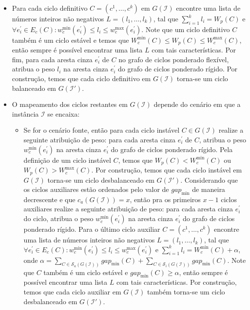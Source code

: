 \begin{itemize}
  \item Para cada ciclo definitivo $C=(c^1,\dots,c^k)$ em $G(\mathcal{I})$ encontre uma lista de números inteiros não negativos $L=(l_1,\dots,l_k)$, tal que $\sum_{i=1}^{k}l_i = W_p(C)$ e $\forall e^{\prime}_i \in E_c(C): w^{\min}_c(e^{\prime}_i) \le l_i \le w^{\max}_c(e^{\prime}_i)$. Note que um ciclo definitivo $C$ também é um ciclo estável e temos que $W^{\min}_c(C) \le W_p(C) \le W^{\max}_c(C)$, então sempre é possível encontrar uma lista $L$ com tais características. Por fim, para cada aresta cinza $e^{\prime}_i$ de $C$ no grafo de ciclos ponderado flexível, atribua o peso $l_i$ na aresta cinza $e^{\prime}_i$ do grafo de ciclos ponderado rígido. Por construção, temos que cada ciclo definitivo em $G(\mathcal{I})$ torna-se um ciclo balanceado em $G(\mathcal{I}')$.
  \item O mapeamento dos ciclos restantes em $G(\mathcal{I})$ depende do cenário em que a instância $\mathcal{I}$ se encaixa: 

  \begin{itemize}
    \item Se for o cenário fonte, então para cada ciclo instável $C \in G(\mathcal{I})$ realize a seguinte atribuição de peso: para cada aresta cinza $e^{\prime}_i$ de $C$, atribua o peso $w^{\min}_c(e^{\prime}_i)$ na aresta cinza $e^{\prime}_i$ do grafo de ciclos ponderado rígido. Pela definição de um ciclo instável $C$, temos que $W_p(C)  < W^{\min}_c(C)$ ou $W_p(C) > W^{\max}_c(C)$. Por construção, temos que cada ciclo instável em $G(\mathcal{I})$ torna-se um ciclo desbalanceado em $G(\mathcal{I}')$. Considerando que os ciclos auxiliares estão ordenados pelo valor de $gap_{\min}$ de maneira decrescente e que $c_a(G(\mathcal{I})) = x$, então pra os primeiros $x-1$ ciclos auxiliares realize a seguinte atribuição de peso: para cada aresta cinza $e^{\prime}_i$ do ciclo, atribua o peso $w^{\min}_c(e^{\prime}_i)$ na aresta cinza $e^{\prime}_i$ do grafo de ciclos ponderado rígido. Para o último ciclo auxiliar $C=(c^1,\dots,c^k)$ encontre uma lista de números inteiros não negativos $L=(l_1,\dots,l_k)$, tal que $\forall e^{\prime}_i \in E_c(C): w^{\min}_c(e^{\prime}_i) \le l_i \le w^{\max}_c(e^{\prime}_i)$ e $\sum_{i=1}^{k}l_i = W^{\min}_c(C) + \alpha$, onde $\alpha = \sum_{C \in \mathcal{S}_a(G(\mathcal{I}))} gap_{\min}(C) + \sum_{C \in \mathcal{S}_i(G(\mathcal{I}))} gap_{\min}(C)$. Note que $C$ também é um ciclo estável e $gap_{\min}(C) \ge \alpha$, então sempre é possível encontrar uma lista $L$ com tais características. Por construção, temos que cada ciclo auxiliar em $G(\mathcal{I})$ também torna-se um ciclo desbalanceado em $G(\mathcal{I}')$.


\end{itemize}
\end{itemize}
